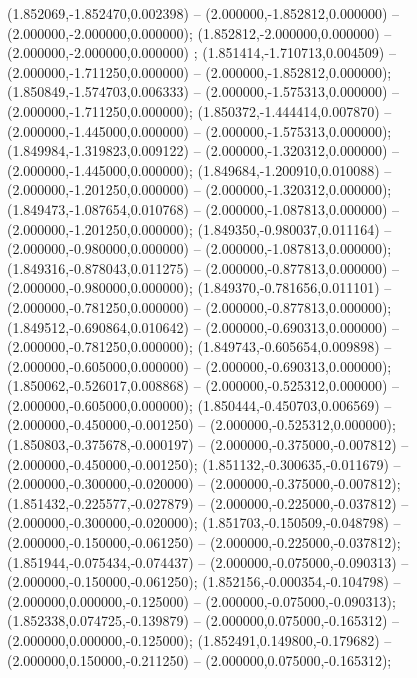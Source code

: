  (1.852069,-1.852470,0.002398) -- (2.000000,-1.852812,0.000000) -- (2.000000,-2.000000,0.000000);
 (1.852812,-2.000000,0.000000) -- (2.000000,-2.000000,0.000000) ;
 (1.851414,-1.710713,0.004509) -- (2.000000,-1.711250,0.000000) -- (2.000000,-1.852812,0.000000);
 (1.850849,-1.574703,0.006333) -- (2.000000,-1.575313,0.000000) -- (2.000000,-1.711250,0.000000);
 (1.850372,-1.444414,0.007870) -- (2.000000,-1.445000,0.000000) -- (2.000000,-1.575313,0.000000);
 (1.849984,-1.319823,0.009122) -- (2.000000,-1.320312,0.000000) -- (2.000000,-1.445000,0.000000);
 (1.849684,-1.200910,0.010088) -- (2.000000,-1.201250,0.000000) -- (2.000000,-1.320312,0.000000);
 (1.849473,-1.087654,0.010768) -- (2.000000,-1.087813,0.000000) -- (2.000000,-1.201250,0.000000);
 (1.849350,-0.980037,0.011164) -- (2.000000,-0.980000,0.000000) -- (2.000000,-1.087813,0.000000);
 (1.849316,-0.878043,0.011275) -- (2.000000,-0.877813,0.000000) -- (2.000000,-0.980000,0.000000);
 (1.849370,-0.781656,0.011101) -- (2.000000,-0.781250,0.000000) -- (2.000000,-0.877813,0.000000);
 (1.849512,-0.690864,0.010642) -- (2.000000,-0.690313,0.000000) -- (2.000000,-0.781250,0.000000);
 (1.849743,-0.605654,0.009898) -- (2.000000,-0.605000,0.000000) -- (2.000000,-0.690313,0.000000);
 (1.850062,-0.526017,0.008868) -- (2.000000,-0.525312,0.000000) -- (2.000000,-0.605000,0.000000);
 (1.850444,-0.450703,0.006569) -- (2.000000,-0.450000,-0.001250) -- (2.000000,-0.525312,0.000000);
 (1.850803,-0.375678,-0.000197) -- (2.000000,-0.375000,-0.007812) -- (2.000000,-0.450000,-0.001250);
 (1.851132,-0.300635,-0.011679) -- (2.000000,-0.300000,-0.020000) -- (2.000000,-0.375000,-0.007812);
 (1.851432,-0.225577,-0.027879) -- (2.000000,-0.225000,-0.037812) -- (2.000000,-0.300000,-0.020000);
 (1.851703,-0.150509,-0.048798) -- (2.000000,-0.150000,-0.061250) -- (2.000000,-0.225000,-0.037812);
 (1.851944,-0.075434,-0.074437) -- (2.000000,-0.075000,-0.090313) -- (2.000000,-0.150000,-0.061250);
 (1.852156,-0.000354,-0.104798) -- (2.000000,0.000000,-0.125000) -- (2.000000,-0.075000,-0.090313);
 (1.852338,0.074725,-0.139879) -- (2.000000,0.075000,-0.165312) -- (2.000000,0.000000,-0.125000);
 (1.852491,0.149800,-0.179682) -- (2.000000,0.150000,-0.211250) -- (2.000000,0.075000,-0.165312);
